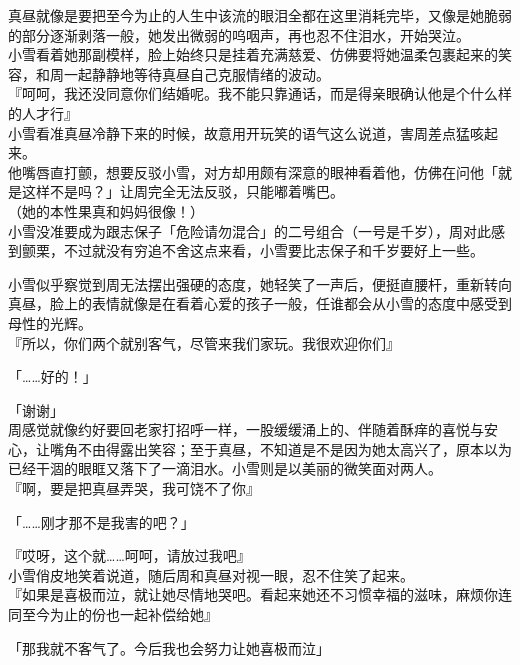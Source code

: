 真昼就像是要把至今为止的人生中该流的眼泪全都在这里消耗完毕，又像是她脆弱的部分逐渐剥落一般，她发出微弱的呜咽声，再也忍不住泪水，开始哭泣。\\

小雪看着她那副模样，脸上始终只是挂着充满慈爱、仿佛要将她温柔包裹起来的笑容，和周一起静静地等待真昼自己克服情绪的波动。\\

『呵呵，我还没同意你们结婚呢。我不能只靠通话，而是得亲眼确认他是个什么样的人才行』\\

小雪看准真昼冷静下来的时候，故意用开玩笑的语气这么说道，害周差点猛咳起来。\\

他嘴唇直打颤，想要反驳小雪，对方却用颇有深意的眼神看着他，仿佛在问他「就是这样不是吗？」让周完全无法反驳，只能嘟着嘴巴。\\

（她的本性果真和妈妈很像！）\\

小雪没准要成为跟志保子「危险请勿混合」的二号组合（一号是千岁），周对此感到颤栗，不过就没有穷追不舍这点来看，小雪要比志保子和千岁要好上一些。

小雪似乎察觉到周无法摆出强硬的态度，她轻笑了一声后，便挺直腰杆，重新转向真昼，脸上的表情就像是在看着心爱的孩子一般，任谁都会从小雪的态度中感受到母性的光辉。\\

『所以，你们两个就别客气，尽管来我们家玩。我很欢迎你们』

「……好的！」

「谢谢」\\

周感觉就像约好要回老家打招呼一样，一股缓缓涌上的、伴随着酥痒的喜悦与安心，让嘴角不由得露出笑容；至于真昼，不知道是不是因为她太高兴了，原本以为已经干涸的眼眶又落下了一滴泪水。小雪则是以美丽的微笑面对两人。\\

『啊，要是把真昼弄哭，我可饶不了你』

「……刚才那不是我害的吧？」

『哎呀，这个就……呵呵，请放过我吧』\\

小雪俏皮地笑着说道，随后周和真昼对视一眼，忍不住笑了起来。\\

『如果是喜极而泣，就让她尽情地哭吧。看起来她还不习惯幸福的滋味，麻烦你连同至今为止的份也一起补偿给她』

「那我就不客气了。今后我也会努力让她喜极而泣」

